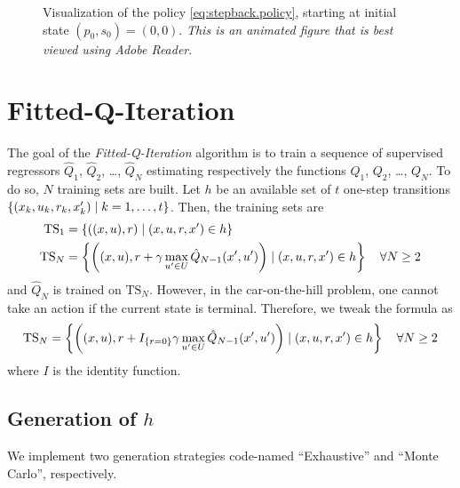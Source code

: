 \documentclass[a4paper, 12pt]{article}
\begin{document}
    \begin{figure}[H]
        \centering
        \caption{Visualization of the policy \eqref{eq:stepback.policy}, starting at initial state $(p_0, s_0) = (0, 0)$. \emph{This is an animated figure that is best viewed using Adobe Reader}.}
        \label{fig:stepback.policy.visualization}
    \end{figure}
    
    \section{Fitted-Q-Iteration}\label{sec:fqi}
    
    The goal of the \emph{Fitted-Q-Iteration} algorithm is to train a sequence of supervised regressors $\hat{Q}_1$, $\hat{Q}_2$, \dots, $\hat{Q}_N$ estimating respectively the functions $Q_1$, $Q_2$, \dots, $Q_N$. To do so, $N$ training sets are built. Let $h$ be an available set of $t$ one-step transitions $\left\{(x_k, u_k, r_k, x'_k) \mid k = 1, \ldots, t\right\}$. Then, the training sets are
    \begin{align*}
        \text{TS}_1 & = \left\{\left((x, u), r\right) \mid (x, u, r, x') \in h\right\} \\
        \text{TS}_N & = \left\{\left((x, u), r + \gamma \max _{u' \in U} \hat{Q}_{N - 1}(x', u')\right) \mid (x, u, r, x') \in h \right\} \quad \forall N \geq 2
    \end{align*}
    and $\hat{Q}_N$ is trained on $\text{TS}_N$. However, in the car-on-the-hill problem, one cannot take an action if the current state is terminal. Therefore, we tweak the formula as
    \begin{equation}
        \text{TS}_N = \left\{\left((x, u), r + I_{\left\{r = 0\right\}} \gamma \max _{u' \in U} \hat{Q}_{N - 1}(x', u')\right) \mid (x, u, r, x') \in h \right\} \quad \forall N \geq 2
    \end{equation}
    where $I$ is the identity function.
    
    \subsection{Generation of $h$}\label{sec:h.generation}
    
    We implement two generation strategies code-named \enquote{Exhaustive} and \enquote{Monte Carlo}, respectively.
    
\end{document}
